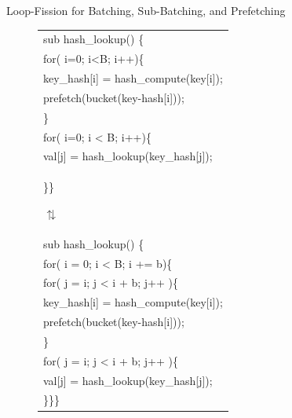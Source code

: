 \documentclass[final]{beamer}
\newlength{\sepwid}
\newlength{\onecolwid}
\newlength{\twocolwid}
\begin{document}
\begin{frame}
\begin{columns}[t]
\begin{column}{\twocolwid}
\begin{exampleblock}{Loop-Fission for Batching, Sub-Batching, and Prefetching}
\begin{multicols}{3}
\begin{figure}[ht]
\begin{tiny}
\begin{tabular}[b]{p{\onecolwid}}
sub\hspace{0.2\sepwid} hash\_lookup() \{\\
\hspace{0.4\sepwid}for( i=0; i<B; i++)\{\\
\hspace{0.6\sepwid}key\_hash[i] = hash\_compute(key[i]);\\
\hspace{0.6\sepwid}prefetch(bucket(key-hash[i]));\\
\hspace{0.4\sepwid}\}\\
\hspace{0.4\sepwid}for( i=0; i < B; i++)\{\\
\hspace{0.6\sepwid}val[j] = hash\_lookup(key\_hash[j]);\\
\}\hspace{0.4\sepwid}\}

\hspace{1\sepwid}$\updownarrows$\\
 
sub{ hash\_lookup()} \{\\
\hspace{0.4\sepwid}for( i = 0; i < B; i += b)\{\\
\hspace{0.6\sepwid}for( j = i; j < i + b; j++ )\{\\
\hspace{0.8\sepwid}key\_hash[i] = hash\_compute(key[i]);\\
\hspace{0.8\sepwid}prefetch(bucket(key-hash[i]));\\
\hspace{0.6\sepwid}\}\\
\hspace{0.6\sepwid}for( j = i; j < i + b; j++ )\{\\
\hspace{0.8\sepwid}val[j] = hash\_lookup(key\_hash[j]);\\
\}\hspace{0.4\sepwid}\}\hspace{0.2\sepwid}\}
\end{tabular}
\end{tiny}
\end{figure}

\end{multicols}
\end{exampleblock}


\end{column}
\end{columns}
\end{frame}
\end{document}
